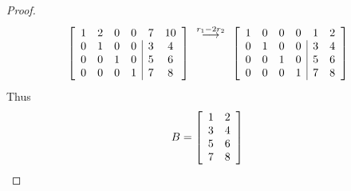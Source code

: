 \documentclass{tutorial}
\begin{document}
\begin{proof}
\[\begin{array}{c}
	\end{array}
	\left[ \begin{array}{cccc|cc}
		1&2&0&0 &7&10\\
		0&1&0&0 &3&4\\
		0&0&1&0 &5&6\\
		0&0&0&1 &7&8
	\end{array} \right] 
	\begin{array}{c} 
		\overset{r_1-2r_2}{\longrightarrow} \\
		\\
		\\
		\\
	\end{array}
	\left[ \begin{array}{cccc|cc}
		1&0&0&0 &1&2\\
		0&1&0&0 &3&4\\
		0&0&1&0 &5&6\\
		0&0&0&1 &7&8
	\end{array} \right] 
\]
Thus
\[
    B = \left[ \begin{array}{cc}
		1&2\\
		3&4\\
		5&6\\
		7&8
	\end{array} \right] 
\]
\end{proof}\else \newpage \fi
\end{document}
